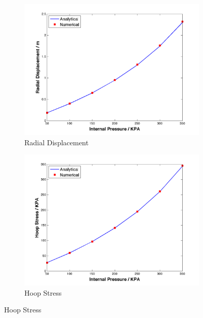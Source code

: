 \begin{figure}[H]
	\begin{subfigure}[b]{0.5\textwidth}
		\centering
		\includegraphics[width=\textwidth]{./figures/ur.png}
		\caption{Radial Displacement}
		\label{ur}
	\end{subfigure}
	\begin{subfigure}[b]{0.5\textwidth}
		\centering
		\includegraphics[width=\textwidth]{./figures/hoop.png}
		\caption{Hoop Stress}
		\label{hoop}
	\end{subfigure}
	

\end{figure}
